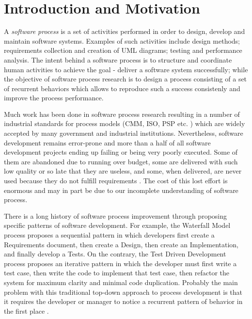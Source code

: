 \documentclass{sig-alternate}
\begin{document}



\section{Introduction and Motivation}
A \textit{software process} is a set of activities performed in order to design, develop and maintain software systems. Examples of such activities include design methods; requirements collection and creation of UML diagrams; testing and performance analysis. The intent behind a software process is to structure and coordinate human activities to achieve the goal - deliver a software system successfully; while the objective of software process research is to design a process consisting of a set of recurrent behaviors which allows to reproduce such a success consistenly and improve the process performance.

Much work has been done in software process research resulting in a number of industrial standards for process models (CMM, ISO, PSP etc. \cite{citeulike:5043104}) which are widely accepted by many government and industrial institutions. Nevertheless, software development remains error-prone and more than a half of all software development projects ending up failing or being very poorly executed. Some of them are abandoned due to running over budget, some are delivered with such low quality or so late that they are useless, and some, when delivered, are never used because they do not fulfill requirements \cite{citeulike:7351135}. The cost of this lost effort is enormous and may in part be due to our incomplete understanding of software process.

There is a long history of software process improvement through proposing specific patterns of software development. For example, the Waterfall Model process proposes a sequential pattern in which developers first create a Requirements document, then create a Design, then create an Implementation, and finally develop a Tests. On the contrary, the Test Driven Development process proposes an iterative pattern in which the developer must first write a test case, then write the code to implement that test case, then refactor the system for maximum clarity and minimal code duplication. Probably the main problem with this traditional top-down approach to process development is that it requires the developer or manager to notice a recurrent pattern of behavior in the first place \cite{citeulike:5043104}. 
\end{document}
